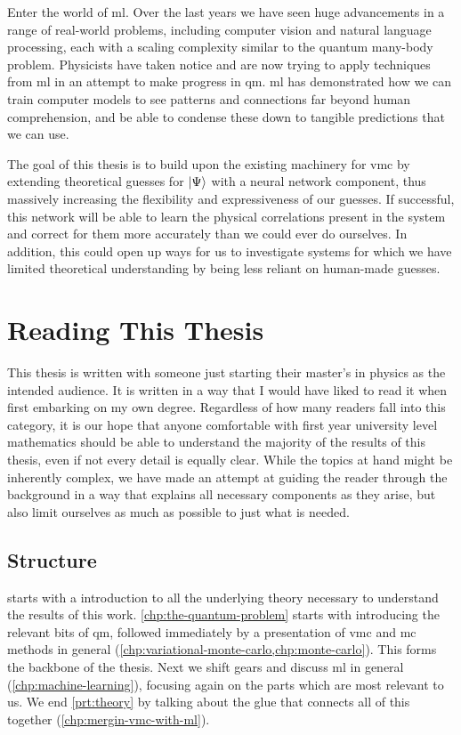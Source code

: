 \documentclass[Thesis.tex]{subfiles}
\begin{document}
Enter the world of \gls{ml}. Over the last years we have seen
huge advancements in a range of real-world problems, including computer vision and
natural language processing, each with a scaling complexity similar to
the quantum many-body problem.
Physicists have taken notice and are now trying
to apply techniques from \gls{ml} in an attempt to make progress in \gls{qm}. \Acrlong{ml} has
demonstrated how we can train computer models to see patterns and connections
far beyond human comprehension, and be able to condense these down to tangible
predictions that we can use.

The goal of this thesis is to build upon the existing machinery for \gls{vmc} by extending
theoretical guesses for $| \Psi \rangle$ with a neural network component, thus massively
increasing the flexibility and expressiveness of our guesses. If successful, this
network will be able to learn the physical correlations present in the system
and correct for them more accurately than we could ever do ourselves. In
addition, this could open up ways for us to investigate systems for which we
have limited theoretical understanding by being less reliant on human-made guesses.


\section*{Reading This Thesis}

This thesis is written with someone just starting their master's in physics as the intended
audience. It is written in a way that I would have liked to read it when first
embarking on my own degree. Regardless of how many readers fall into this
category, it is our hope that anyone comfortable with first year university
level mathematics should be able to understand the majority of the results of this
thesis, even if not every detail is equally clear. While the topics at hand might be
inherently complex, we have made an attempt at guiding the reader through the
background in a way that explains all necessary components as they arise, but
also limit ourselves as much as possible to just what is needed.


\subsection*{Structure}
 starts with a introduction to all the underlying theory
necessary to understand the results of this work. \cref{chp:the-quantum-problem}
starts with introducing the relevant bits of \acrlong{qm}, followed
immediately by a presentation of \acrlong{vmc} and \acrlong{mc} methods
in general (\cref{chp:variational-monte-carlo,chp:monte-carlo}). This forms the
backbone of the thesis. Next we shift gears and discuss \acrlong{ml} in
general (\cref{chp:machine-learning}), focusing again on the parts which are
most relevant to us. We end \cref{prt:theory} by talking about the glue that
connects all of this together (\cref{chp:mergin-vmc-with-ml}).
\end{document}
